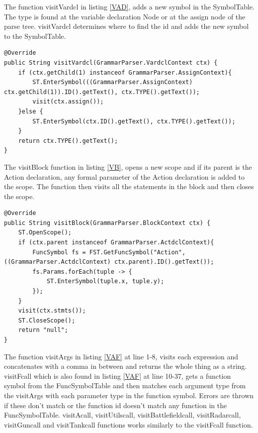 The function visitVardcl in listing \ref{VAD}, adds a new symbol in the SymbolTable. The type is found at the variable declaration Node or at the assign node of the parse tree. visitVardcl determines where to find the id and adds the new symbol to the SymbolTable. 

\begin{lstlisting}[caption={SymbolTypeVisitor - visitVardcl function}, label={VAD}]
@Override
public String visitVardcl(GrammarParser.VardclContext ctx) {
    if (ctx.getChild(1) instanceof GrammarParser.AssignContext){
        ST.EnterSymbol(((GrammarParser.AssignContext) ctx.getChild(1)).ID().getText(), ctx.TYPE().getText());
        visit(ctx.assign());
    }else {
        ST.EnterSymbol(ctx.ID().getText(), ctx.TYPE().getText());
    }
    return ctx.TYPE().getText();
}
\end{lstlisting}

The visitBlock function in listing \ref{VB}, opens a new scope and if its parent is the Action declaration, any formal parameter of the Action declaration  is added to the scope. The function then visits all the statements in the block and then closes the scope. 

\begin{lstlisting}[caption={SymbolTypeVisitor - visitBlock function}, label={VB}]
@Override
public String visitBlock(GrammarParser.BlockContext ctx) {
    ST.OpenScope();
    if (ctx.parent instanceof GrammarParser.ActdclContext){
        FuncSymbol fs = FST.GetFuncSymbol("Action", ((GrammarParser.ActdclContext) ctx.parent).ID().getText());
        fs.Params.forEach(tuple -> {
            ST.EnterSymbol(tuple.x, tuple.y);
        });
    }
    visit(ctx.stmts());
    ST.CloseScope();
    return "null";
}
\end{lstlisting}

The function visitArgs in listing \ref{VAF} at line 1-8, visits each expression and concatenates with a comma in between and returns the whole thing as a string. 
visitFcall which is also found in listing \ref{VAF} at line 10-37, gets a function symbol from the FuncSymbolTable and then matches each argument type from the visitArgs with each parameter type in the function symbol. Errors are thrown if these don't match or the function id doesn't match any function in the FuncSymbolTable. visitAcall, visitUtilscall, visitBattlefieldcall, visitRadarcall, visitGuncall and visitTankcall functions works similarly to the visitFcall function.

